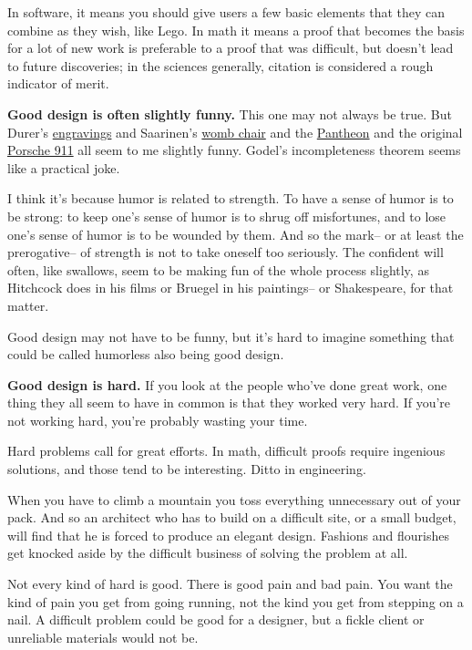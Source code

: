 In software, it means you should give users a few basic elements that
they can combine as they wish, like Lego. In math it means a proof that
becomes the basis for a lot of new work is preferable to a proof that
was difficult, but doesn't lead to future discoveries; in the sciences
generally, citation is considered a rough indicator of merit.

\textbf{Good design is often slightly funny.} This one may not always be
true. But Durer's \href{pilate.html}{engravings} and Saarinen's
\href{womb.html}{womb chair} and the \href{pantheon.html}{Pantheon} and
the original \href{1974-911s.html}{Porsche 911} all seem to me slightly
funny. Godel's incompleteness theorem seems like a practical joke.

I think it's because humor is related to strength. To have a sense of
humor is to be strong: to keep one's sense of humor is to shrug off
misfortunes, and to lose one's sense of humor is to be wounded by them.
And so the mark-- or at least the prerogative-- of strength is not to
take oneself too seriously. The confident will often, like swallows,
seem to be making fun of the whole process slightly, as Hitchcock does
in his films or Bruegel in his paintings-- or Shakespeare, for that
matter.

Good design may not have to be funny, but it's hard to imagine something
that could be called humorless also being good design.

\textbf{Good design is hard.} If you look at the people who've done
great work, one thing they all seem to have in common is that they
worked very hard. If you're not working hard, you're probably wasting
your time.

Hard problems call for great efforts. In math, difficult proofs require
ingenious solutions, and those tend to be interesting. Ditto in
engineering.

When you have to climb a mountain you toss everything unnecessary out of
your pack. And so an architect who has to build on a difficult site, or
a small budget, will find that he is forced to produce an elegant
design. Fashions and flourishes get knocked aside by the difficult
business of solving the problem at all.

Not every kind of hard is good. There is good pain and bad pain. You
want the kind of pain you get from going running, not the kind you get
from stepping on a nail. A difficult problem could be good for a
designer, but a fickle client or unreliable materials would not be.

